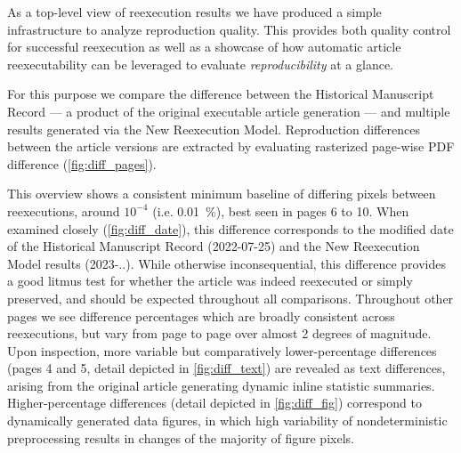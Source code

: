 As a top-level view of reexecution results we have produced a simple infrastructure to analyze reproduction quality.
This provides both quality control for successful reexecution as well as a showcase of how automatic article reexecutability can be leveraged to evaluate \textit{reproducibility} at a glance.

For this purpose we compare the difference between the Historical Manuscript Record — a product of the original executable article generation — and multiple results generated via the New Reexecution Model.
Reproduction differences between the article versions are extracted by evaluating rasterized page-wise PDF difference (\ref{fig:diff_pages}).


This overview shows a consistent minimum baseline of differing pixels between reexecutions, around $10^{-4}$ (i.e. \SI{0.01}{\percent}), best seen in pages 6 to 10.
When examined closely (\ref{fig:diff_date}), this difference corresponds to the modified date of the Historical Manuscript Record (2022-07-25) and the New Reexecution Model results (2023-..).
While otherwise inconsequential, this difference provides a good litmus test for whether the article was indeed reexecuted or simply preserved, and should be expected throughout all comparisons.
Throughout other pages we see difference percentages which are broadly consistent across reexecutions, but vary from page to page over almost 2 degrees of magnitude.
Upon inspection, more variable but comparatively lower-percentage differences (pages 4 and 5, detail depicted in \cref{fig:diff_text}) are revealed as text differences, arising from the original article generating dynamic inline statistic summaries.
Higher-percentage differences (detail depicted in \cref{fig:diff_fig}) correspond to dynamically generated data figures, in which high variability of nondeterministic preprocessing results in changes of the majority of figure pixels.

